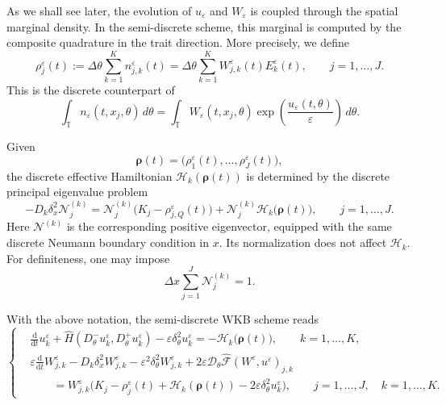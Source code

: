 \documentclass[11pt]{article}
\begin{document}
As we shall see later, the evolution of \(u_\varepsilon\) and
\(W_\varepsilon\) is coupled through the spatial marginal density.  In the
semi-discrete scheme, this marginal is computed by the composite quadrature in
the trait direction.  More precisely, we define
\begin{equation}\label{eq:E_rho}
\rho_{j}^\varepsilon(t)
:=
\Delta\theta
\sum_{k=1}^K
n_{j,k}^\varepsilon(t)
=
\Delta\theta
\sum_{k=1}^K
W_{j,k}^\varepsilon(t)E_k^\varepsilon(t),
\qquad
j=1,\dots,J .
\end{equation}
This is the discrete counterpart of
\[
\int_{\mathbb T}
n_\varepsilon(t,x_j,\theta)\,d\theta
=
\int_{\mathbb T}
W_\varepsilon(t,x_j,\theta)
\exp\!\left(\frac{u_\varepsilon(t,\theta)}{\varepsilon}\right)
\,d\theta .
\]



Given
\[
\boldsymbol\rho(t)
=
\bigl(\rho_{1}^\varepsilon(t),\dots,\rho_{J}^\varepsilon(t)\bigr),
\]
the discrete effective Hamiltonian
\(\mathcal H_k(\boldsymbol\rho(t))\) is determined by the discrete
principal eigenvalue problem
\begin{equation}\label{eq:eigen_discrete}
-D_k\delta_x^2\mathcal N_j^{(k)}
=
\mathcal N_j^{(k)}
\bigl(K_j-\rho_{j,Q}^\varepsilon(t)\bigr)
+
\mathcal N_j^{(k)}
\mathcal H_k\bigl(\boldsymbol\rho(t)\bigr),
\qquad
j=1,\dots,J .
\end{equation}
Here \(\mathcal N^{(k)}\) is the corresponding positive eigenvector, equipped
with the same discrete Neumann boundary condition in \(x\). Its normalization
does not affect \(\mathcal H_k\). For definiteness, one may impose
\[
\Delta x\sum_{j=1}^J \mathcal N_j^{(k)}=1 .
\]

With the above notation, the semi-discrete WKB scheme reads
\begin{equation}\label{eq:semi_discrete_WKB_system}
\left\{
\begin{aligned}
&\frac{\mathrm d}{\mathrm dt}u_k^\varepsilon
+
\widehat H
\left(
D_\theta^-u_k^\varepsilon,
D_\theta^+u_k^\varepsilon
\right)
-
\varepsilon\delta_\theta^2u_k^\varepsilon
=
-\mathcal H_k\bigl(\boldsymbol\rho(t)\bigr),
\qquad
k=1,\dots,K,
\\[1mm]
&\varepsilon
\frac{\mathrm d}{\mathrm dt}W_{j,k}^\varepsilon
-
D_k\delta_x^2W_{j,k}^\varepsilon
-
\varepsilon^2\delta_\theta^2W_{j,k}^\varepsilon
+
2\varepsilon
\mathcal D_\theta
\widehat{\mathcal F}(W^\varepsilon,u^\varepsilon)_{j,k}
\\
&\qquad =
W_{j,k}^\varepsilon
\bigl(
K_j-\rho_{j}^\varepsilon(t)
+\mathcal H_k(\boldsymbol\rho(t))
-2\varepsilon\delta_\theta^2u_k^\varepsilon
\bigr),
\qquad
j=1,\dots,J,\quad k=1,\dots,K .
\end{aligned}
\right.
\end{equation}
\end{document}
